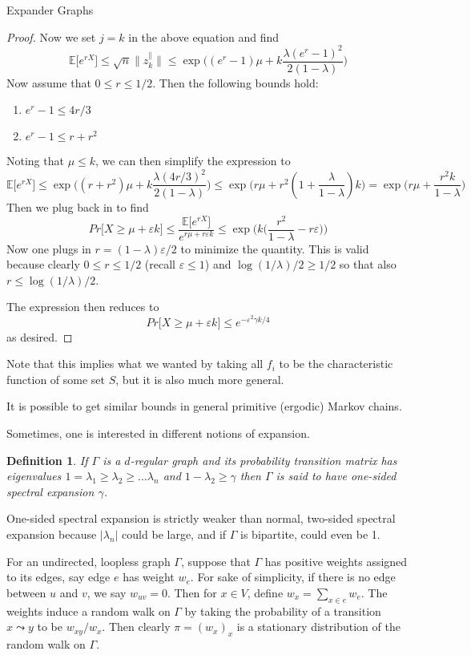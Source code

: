 \documentclass{article}
\newcommand{\E}{\mathbb E}
\newcommand{\eps}{\varepsilon}
\newtheorem{defn}{Definition}
\begin{document}
\begin{section}{Expander Graphs}
\begin{proof}
    Now we set $j = k$ in the above equation and find
    $$
    \E\big[e^{rX}\big] \leq \sqrt{n}\lVert z_k^\parallel\rVert \leq \exp\bigg((e^r-1)\mu + k\frac{\lambda(e^r-1)^2}{2(1-\lambda)}\bigg)
    $$
    Now assume that $0 \leq r \leq 1/2$.
    Then the following bounds hold:
    \begin{enumerate}
      \item
	$e^r - 1 \leq 4r/3$
      \item
	$e^r - 1 \leq r + r^2$
    \end{enumerate}
    Noting that $\mu \leq k$, we can then simplify the expression to
    $$
    \E\big[e^{rX}\big] \leq \exp\bigg((r+r^2)\mu + k\frac{\lambda(4r/3)^2}{2(1-\lambda)}\bigg) \leq \exp\big(r\mu + r^2(1+\frac{\lambda}{1-\lambda})k\big) = \exp\big(r\mu + \frac{r^2k}{1-\lambda}\big)
    $$
    Then we plug back in to find
    $$
    Pr\big[X \geq \mu + \eps k\big] \leq \frac{\E\big[e^{rX}\big]}{e^{r\mu + r\eps k}} \leq \exp\bigg(k\big(\frac{r^2}{1-\lambda} - r\eps\big)\bigg)
    $$
    Now one plugs in $r = (1-\lambda)\eps / 2$ to minimize the quantity.
    This is valid because clearly $0 \leq r \leq 1/2$ (recall $\eps \leq 1$) and $\log(1/\lambda)/2 \geq 1/2$ so that also $r \leq \log(1/\lambda)/2$.

    The expression then reduces to
    $$
    Pr\big[X \geq \mu + \eps k\big] \leq e^{-\eps^2\gamma k/4}
    $$
    as desired.
  \end{proof}
  Note that this implies what we wanted by taking all $f_i$ to be the characteristic function of some set $S$, but it is also much more general.

  It is possible to get similar bounds in general primitive (ergodic) Markov chains.

   Sometimes, one is interested in different notions of expansion.

   \begin{defn}
     If $\Gamma$ is a $d$-regular graph and its probability transition matrix has eigenvalues $1 = \lambda_1 \geq \lambda_2 \geq \ldots \lambda_n$ and $1-\lambda_2 \geq \gamma$ then $\Gamma$ is said to have one-sided spectral expansion $\gamma$.
   \end{defn}

   One-sided spectral expansion is strictly weaker than normal, two-sided spectral expansion because $|\lambda_n|$ could be large, and if $\Gamma$ is bipartite, could even be 1.

    For an undirected, loopless graph $\Gamma$, suppose that $\Gamma$ has positive weights assigned to its edges, say edge $e$ has weight $w_e$.
    For sake of simplicity, if there is no edge between $u$ and $v$, we say $w_{uv} = 0$.
   Then for $x \in V$, define $w_x = \sum_{x \in e}w_e$.
   The weights induce a random walk on $\Gamma$ by taking the probability of a transition $x \leadsto y$ to be $w_{xy}/w_x$.
   Then clearly $\pi = (w_x)_x$ is a stationary distribution of the random walk on $\Gamma$.


\end{section}
\end{document}
